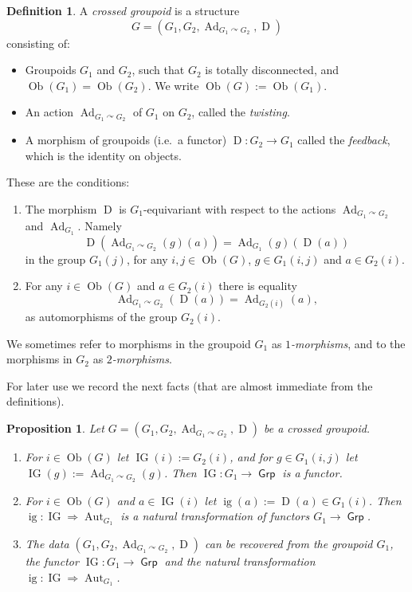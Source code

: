 \documentclass[a4paper, 10pt]{amsart}
\newtheorem{prop}[equation]{Proposition}
\theoremstyle{definition}
\newtheorem{dfn}[equation]{Definition}
\numberwithin{equation}{section}
\newcommand{\opn}{\operatorname}
\newcommand{\cat}[1]{\operatorname{\mathsf{#1}}}
\newcommand{\rmitem}[1]{\item[\text{\textup{(#1)}}]}
\newcommand{\twoto}{\Rightarrow}
\newcommand{\crvar}{\curvearrowright}
\begin{document}
\begin{dfn} \label{dfn:cosim.101}
A {\em crossed groupoid} is a structure 
\[ G = 
( G_1, G_2, 
\opn{Ad}_{G_1 \crvar G_{2}}, \opn{D} ) \]
consisting of:
\begin{itemize}
\item Groupoids $G_1$ and $G_2$, such that 
$G_2$ is totally disconnected, and 
$\opn{Ob}(G_1) = \opn{Ob}(G_2)$. 
We write $\opn{Ob}(G) := \opn{Ob}(G_1)$. 

\item An action $\opn{Ad}_{G_1 \crvar G_{2}}$ of 
$G_1$ on $G_2$, called the {\em twisting}. 

\item A morphism of groupoids (i.e.\ a functor) 
$\opn{D} : G_2 \to G_1$
called the {\em feedback}, which is the identity on objects.
\end{itemize}

These are the conditions:
\begin{enumerate}
\rmitem{i} The morphism $\opn{D}$ is $G_1$-equivariant with respect to
the actions $\opn{Ad}_{G_1 \crvar G_{2}}$ and
$\opn{Ad}_{G_1}$. Namely 
\[ \opn{D}(\opn{Ad}_{G_1 \crvar G_{2}}(g)(a)) =
\opn{Ad}_{G_1}(g)(\opn{D}(a)) \]
in the group $G_1(j)$, for any $i, j \in \opn{Ob}(G)$, 
$g \in G_1(i, j)$ and $a \in G_2(i)$.

\rmitem{ii} For any $i \in \opn{Ob}(G)$ and 
$a \in G_2(i)$ there is equality
\[ \opn{Ad}_{G_1 \crvar G_{2}}(\opn{D}(a)) =
\opn{Ad}_{G_2(i)}(a) , \]
as automorphisms of the group $G_2(i)$.
\end{enumerate}
\end{dfn}

We sometimes refer to morphisms in the groupoid $G_1$ as {\em
$1$-morphisms}, and to the morphisms in $G_2$ as {\em
$2$-morphisms}. 

For later use we record the next facts (that are almost immediate from the
definitions). 

\begin{prop} \label{prop:200}
Let 
$G = ( G_1, G_2, \opn{Ad}_{G_1 \crvar G_{2}}, \opn{D} )$
be a crossed groupoid. 
\begin{enumerate}
\item For $i \in \opn{Ob}(G)$ let $\opn{IG}(i) := G_2(i)$, and for 
$g \in G_1(i, j)$ let 
$\opn{IG}(g) := \opn{Ad}_{G_1 \crvar G_{2}}(g)$. 
Then 
$\opn{IG} : G_1 \to \cat{Grp}$
is a functor. 

\item For $i \in \opn{Ob}(G)$ and $a \in \opn{IG}(i)$ let 
$\opn{ig}(a) := \opn{D}(a) \in G_1(i)$. Then 
$\opn{ig} : \opn{IG} \twoto \opn{Aut}_{G_1}$
is a natural transformation of functors $G_1 \to \cat{Grp}$. 

\item The data $( G_1, G_2, \opn{Ad}_{G_1 \crvar G_{2}}, \opn{D} )$
can be recovered from the groupoid $G_1$, the functor 
$\opn{IG} : G_1 \to \cat{Grp}$ and the 
 natural transformation 
$\opn{ig} : \opn{IG} \twoto \opn{Aut}_{G_1}$.
\end{enumerate}
\end{prop}
\end{document}
